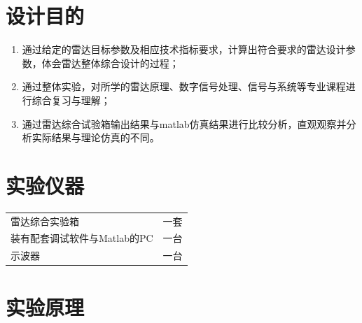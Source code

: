 \documentclass[12pt]{article}
\begin{document}
\setcounter{page}{1}
\section{设计目的}
\setcounter{table}{0}\setcounter{figure}{0}\setcounter{equation}{0}
\begin{enumerate}
  \item 通过给定的雷达目标参数及相应技术指标要求，计算出符合要求的雷达设计参数，体会雷达整体综合设计的过程；
\item 通过整体实验，对所学的雷达原理、数字信号处理、信号与系统等专业课程进行综合复习与理解；
\item 通过雷达综合试验箱输出结果与matlab仿真结果进行比较分析，直观观察并分析实际结果与理论仿真的不同。
\end{enumerate}
\section{实验仪器}
\setcounter{table}{0}\setcounter{figure}{0}\setcounter{equation}{0}
\begin{tabular}{ll}
雷达综合实验箱&一套\\
装有配套调试软件与Matlab的PC&一台\\
示波器&一台\\
\end{tabular}
\section{实验原理}
\setcounter{table}{0}\setcounter{figure}{0}\setcounter{equation}{0}
\end{document}

